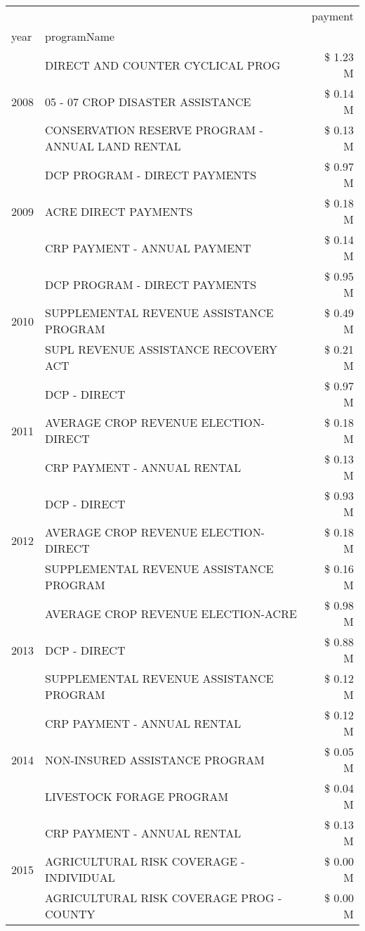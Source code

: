 \begin{tabular}{llr}
\toprule
 &  & payment \\
year & programName &  \\
\midrule
\multirow[t]{3}{*}{2008} & DIRECT AND COUNTER CYCLICAL PROG & \$ 1.23 M \\
 & 05 - 07 CROP DISASTER ASSISTANCE & \$ 0.14 M \\
 & CONSERVATION RESERVE PROGRAM - ANNUAL LAND RENTAL & \$ 0.13 M \\
\cline{1-3}
\multirow[t]{3}{*}{2009} & DCP PROGRAM - DIRECT PAYMENTS & \$ 0.97 M \\
 & ACRE DIRECT PAYMENTS & \$ 0.18 M \\
 & CRP PAYMENT - ANNUAL PAYMENT & \$ 0.14 M \\
\cline{1-3}
\multirow[t]{3}{*}{2010} & DCP PROGRAM - DIRECT PAYMENTS & \$ 0.95 M \\
 & SUPPLEMENTAL REVENUE ASSISTANCE PROGRAM & \$ 0.49 M \\
 & SUPL REVENUE ASSISTANCE RECOVERY ACT & \$ 0.21 M \\
\cline{1-3}
\multirow[t]{3}{*}{2011} & DCP - DIRECT & \$ 0.97 M \\
 & AVERAGE CROP REVENUE ELECTION-DIRECT & \$ 0.18 M \\
 & CRP PAYMENT - ANNUAL RENTAL & \$ 0.13 M \\
\cline{1-3}
\multirow[t]{3}{*}{2012} & DCP - DIRECT & \$ 0.93 M \\
 & AVERAGE CROP REVENUE ELECTION-DIRECT & \$ 0.18 M \\
 & SUPPLEMENTAL REVENUE ASSISTANCE PROGRAM & \$ 0.16 M \\
\cline{1-3}
\multirow[t]{3}{*}{2013} & AVERAGE CROP REVENUE ELECTION-ACRE & \$ 0.98 M \\
 & DCP - DIRECT & \$ 0.88 M \\
 & SUPPLEMENTAL REVENUE ASSISTANCE PROGRAM & \$ 0.12 M \\
\cline{1-3}
\multirow[t]{3}{*}{2014} & CRP PAYMENT - ANNUAL RENTAL & \$ 0.12 M \\
 & NON-INSURED ASSISTANCE PROGRAM & \$ 0.05 M \\
 & LIVESTOCK FORAGE PROGRAM & \$ 0.04 M \\
\cline{1-3}
\multirow[t]{3}{*}{2015} & CRP PAYMENT - ANNUAL RENTAL & \$ 0.13 M \\
 & AGRICULTURAL RISK COVERAGE - INDIVIDUAL & \$ 0.00 M \\
 & AGRICULTURAL RISK COVERAGE PROG - COUNTY & \$ 0.00 M \\

\end{tabular}
